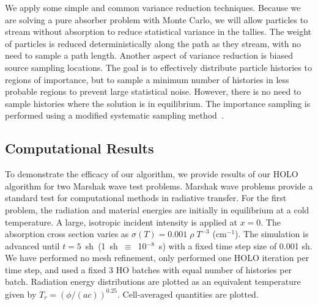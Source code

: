 \documentclass[11pt]{article}
\begin{document}
We apply some simple and common variance reduction techniques.
 Because we are solving a pure absorber problem with Monte Carlo, we will allow
particles to stream without absorption to reduce statistical 
variance in the tallies.  The weight of particles is reduced deterministically along
the path as they stream, with no need to sample a path length.  Another aspect of
variance reduction is biased source sampling locations.  The goal is to effectively distribute particle
histories to regions of importance, but to sample a minimum number of histories in
less probable regions to prevent large statistical noise.  However, there is no need
to sample histories where the solution is in equilibrium.
The importance sampling is
performed using a modified
systematic sampling method~\cite{shultis_mc}. 

\subsection{Computational Results}

To demonstrate the efficacy of our algorithm, we provide results of our HOLO
algorithm for two Marshak wave test problems.  Marshak wave problems provide a standard test
for computational methods in radiative transfer.  
For the first problem, the radiation and material energies are initially in
equilibrium at a cold temperature.   A large, isotropic incident intensity is applied
at $x=0$.  The absorption cross section varies as $\sigma(T) = 0.001\;\rho\; T^{-3}$ (cm$^{-1}$).
The simulation is advanced until $t=5$~sh~(1~sh~$\equiv$~10$^{-8}$~s) with a fixed time step size of 0.001 sh. 
We have performed no mesh refinement, only performed one HOLO iteration per time
step, and used a fixed 3 HO batches with equal number of histories per batch. 
Radiation energy distributions are plotted as an equivalent temperature given by
$T_r=(\phi/(ac))^{0.25}$.  Cell-averaged quantities are plotted.
\end{document}
